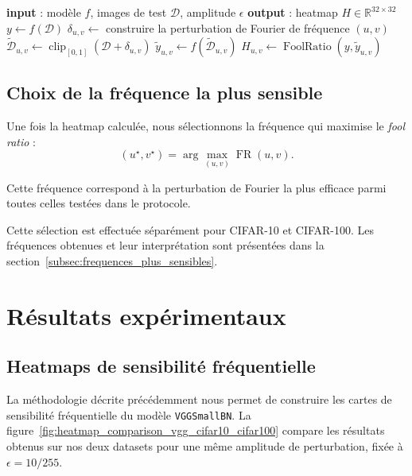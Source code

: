 \begin{algorithm}[H]
\caption{Génération d'une heatmap de sensibilité fréquentielle}
\label{algo:algorithme_heatmap}
\begin{algorithmic}
\State \textbf{input} : modèle $f$, images de test $\mathcal{D}$, amplitude $\epsilon$
\State \textbf{output} : heatmap $H \in \mathbb{R}^{32 \times 32}$
\State
\State $y \leftarrow f(\mathcal{D})$ 
        \State $\delta_{u,v} \leftarrow$ construire la perturbation de Fourier de fréquence $(u,v)$
        \State $\tilde{\mathcal{D}}_{u,v} \leftarrow \operatorname{clip}_{[0,1]}(\mathcal{D} + \delta_{u,v})$
        \State $\tilde{y}_{u,v} \leftarrow f(\tilde{\mathcal{D}}_{u,v})$
        \State $H_{u,v} \leftarrow \operatorname{FoolRatio}(y,\tilde{y}_{u,v})$
    \EndFor
\EndFor
\end{algorithmic}
\end{algorithm}

\subsection{Choix de la fréquence la plus sensible}
\label{subsec:choix_frequence_sensible}

Une fois la heatmap calculée, nous sélectionnons la fréquence qui maximise le \textit{fool ratio} :
\[
    (u^\star,v^\star)
    =
    \arg\max_{(u,v)}
    \operatorname{FR}(u,v).
\]

Cette fréquence correspond à la perturbation de Fourier la plus efficace parmi toutes celles testées
dans le protocole.

Cette sélection est effectuée séparément pour CIFAR-10 et CIFAR-100. Les fréquences obtenues et
leur interprétation sont présentées dans la section~\ref{subsec:frequences_plus_sensibles}.

\section{Résultats expérimentaux}
\label{sec:resultats_experimentaux}

\subsection{Heatmaps de sensibilité fréquentielle}
\label{subsec:resultats_heatmaps}

La méthodologie décrite précédemment nous permet de construire les cartes de sensibilité fréquentielle
du modèle \texttt{VGGSmallBN}. La figure~\ref{fig:heatmap_comparison_vgg_cifar10_cifar100}
compare les résultats obtenus sur nos deux datasets pour une même amplitude de perturbation,
fixée à $\epsilon = 10/255$.

